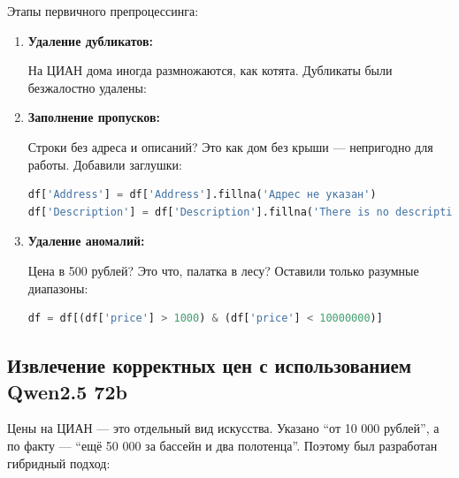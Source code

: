 \documentclass{article}
\begin{document}
Этапы первичного препроцессинга:
\begin{enumerate}
    \item \textbf{Удаление дубликатов:}
    
    На ЦИАН дома иногда размножаются, как котята. Дубликаты были безжалостно удалены:
    \item \textbf{Заполнение пропусков:}
    
    Строки без адреса и описаний? Это как дом без крыши — непригодно для работы. Добавили заглушки:
        \begin{lstlisting}[language=Python]
df['Address'] = df['Address'].fillna('Адрес не указан')
df['Description'] = df['Description'].fillna('There is no description')
        \end{lstlisting}
    \item \textbf{Удаление аномалий:}
    
    Цена в 500 рублей? Это что, палатка в лесу? Оставили только разумные диапазоны:
        \begin{lstlisting}[language=Python]
df = df[(df['price'] > 1000) & (df['price'] < 10000000)]
        \end{lstlisting}
\end{enumerate}

\subsection{Извлечение корректных цен с использованием Qwen2.5 72b}

Цены на ЦИАН — это отдельный вид искусства. Указано “от 10 000 рублей”, а по факту — “ещё 50 000 за бассейн и два полотенца”. Поэтому был разработан гибридный подход:
\end{document}
